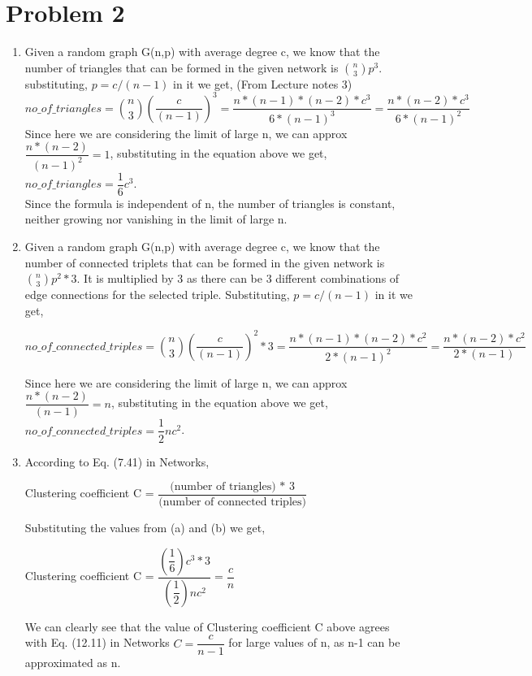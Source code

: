 \documentclass{article}
\begin{document}
\section*{Problem 2}
\begin{enumerate}[label=(\alph*)]
\item
Given a random graph G(n,p) with average degree c, we know that the number of triangles that can be formed in the given network is $\binom n3 p^3$. substituting, $p=c/(n-1)$ in it we get, (From Lecture notes 3)
$$no\_of\_triangles = \binom n3 (\frac{c}{(n-1)})^3 = \frac{n*(n-1)*(n-2)*c^3}{6*(n-1)^3} = \frac{n*(n-2)*c^3}{6*(n-1)^2}$$
Since here we are considering the limit of large n, we can approx $\dfrac{n*(n-2)}{(n-1)^2} = 1$, substituting in the equation above we get,
$no\_of\_triangles = \dfrac{1}{6}c^3$.\\

Since the formula is independent of n, the number of triangles is constant, neither growing nor vanishing in the limit of large n.

\item
Given a random graph G(n,p) with average degree c, we know that the number of connected triplets that can be formed in the given network is $\binom n3 p^2 * 3$. It is multiplied by 3 as there can be 3 different combinations of edge connections for the selected triple. Substituting, $p=c/(n-1)$ in it we get,

$$no\_of\_connected\_triples = \binom n3 (\frac{c}{(n-1)})^2 * 3 = \frac{n*(n-1)*(n-2)*c^2}{2*(n-1)^2} = \frac{n*(n-2)*c^2}{2*(n-1)} $$

Since here we are considering the limit of large n, we can approx $\dfrac{n*(n-2)}{(n-1)} = n$, substituting in the equation above we get, $no\_of\_connected\_triples = \dfrac{1}{2}nc^2$.

\item
According to Eq. (7.41) in Networks, 
\begin{center}
Clustering coefficient C = $\dfrac{\text{(number of triangles) * 3}}{\text{(number of connected triples)}}$
\end{center}
Substituting the values from (a) and (b) we get,
\begin{center}
Clustering coefficient C = $\dfrac{(\dfrac{1}{6})c^3*3}{(\dfrac{1}{2})nc^2} = \dfrac{c}{n}$
\end{center} 
We can clearly see that the value of Clustering coefficient C above agrees with Eq. (12.11) in Networks $C=\dfrac{c}{n-1}$ for large values of n, as n-1 can be approximated as n.
\end{enumerate}
\end{document}
